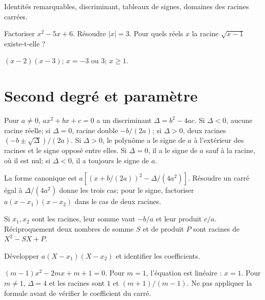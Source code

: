\label{t11s-c08}
\begin{revision}Identités remarquables, discriminant, tableaux de signes, domaines des racines carrées.\end{revision}
\begin{automatismes}\exo\label{t11s-c08-auto}Factoriser $x^2-5x+6$. Résoudre $|x|=3$. Pour quels réels $x$ la racine $\sqrt{x-1}$ existe-t-elle ?\end{automatismes}
\begin{corrige}\label{sol-t11s-c08-auto}$(x-2)(x-3)$; $x=-3$ ou $3$; $x\ge1$.\end{corrige}

\section{Second degré et paramètre}
\begin{propriete}Pour $a\ne0$, $ax^2+bx+c=0$ a un discriminant $\Delta=b^2-4ac$. Si $\Delta<0$, aucune racine réelle; si $\Delta=0$, racine double $-b/(2a)$; si $\Delta>0$, deux racines $(-b\pm\sqrt\Delta)/(2a)$. Si $\Delta>0$, le polynôme a le signe de $a$ à l’extérieur des racines et le signe opposé entre elles. Si $\Delta=0$, il a le signe de $a$ sauf à la racine, où il est nul; si $\Delta<0$, il a toujours le signe de $a$.\end{propriete}
\begin{demonstration}La forme canonique est $a[(x+b/(2a))^2-\Delta/(4a^2)]$. Résoudre un carré égal à $\Delta/(4a^2)$ donne les trois cas; pour le signe, factoriser $a(x-x_1)(x-x_2)$ dans le cas de deux racines.\end{demonstration}
\begin{propriete}Si $x_1,x_2$ sont les racines, leur somme vaut $-b/a$ et leur produit $c/a$. Réciproquement deux nombres de somme $S$ et de produit $P$ sont racines de $X^2-SX+P$.\end{propriete}
\begin{demonstration}Développer $a(X-x_1)(X-x_2)$ et identifier les coefficients.\end{demonstration}
\begin{exemple}$(m-1)x^2-2mx+m+1=0$. Pour $m=1$, l’équation est linéaire : $x=1$. Pour $m\ne1$, $\Delta=4$ et les racines sont $1$ et $(m+1)/(m-1)$. Ne pas appliquer la formule avant de vérifier le coefficient du carré.\end{exemple}
